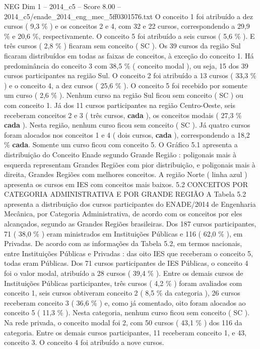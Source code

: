\begin{textsample}{NEG Dim 1 – 2014\_c5 – Score 8.00 – 2014\_c5/enade\_2014\_eng\_mec\_5ff0301576.txt}
O conceito 1 foi atribuído a dez cursos ( 9,3 \% ) e os conceitos 2 e 4, com 32 e 22 cursos, correspondendo a 29,9 \% e 20,6 \%, respectivamente.
O conceito 5 foi atribuído a seis cursos ( 5,6 \% ).
E três cursos ( 2,8 \% ) ficaram sem conceito ( SC ).
Os 39 cursos da região Sul ficaram distribuídos em todas as faixas de conceitos, à exceção do conceito 1.
Há predominância do conceito 3 com 38,5 \% ( conceito modal ), ou seja, 15 dos 39 cursos participantes na região Sul.
O conceito 2 foi atribuído a 13 cursos ( 33,3 \% ) e o conceito 4, a dez cursos ( 25,6 \% ).
O conceito 5 foi recebido por somente um curso ( 2,6 \% ).
Nenhum curso na região Sul ficou sem conceito ( SC ) ou com conceito 1.
Já dos 11 cursos participantes na região Centro-Oeste, seis receberam conceitos 2 e 3 ( três cursos, \textbf{cada} ), os conceitos modais ( 27,3 \% \textbf{cada} ).
Nesta região, nenhum curso ficou sem conceito ( SC ).
Já quatro cursos foram alocados nos conceitos 1 e 4 ( dois cursos, \textbf{cada} ), correspondendo a 18,2 \% \textbf{cada}.
Somente um curso ficou com conceito 5.
O Gráfico 5.1 apresenta a distribuição do Conceito Enade segundo Grande Região : poligonais mais à esquerda representam Grandes Regiões com pior distribuição, e poligonais mais à direita, Grandes Regiões com melhores conceitos.
A região Norte ( linha azul ) apresenta os cursos em IES com conceitos mais baixos. 5.2 CONCEITOS POR CATEGORIA ADMINISTRATIVA E POR GRANDE REGIÃO A Tabela 5.2 apresenta a distribuição dos cursos participantes do ENADE/2014 de Engenharia Mecânica, por Categoria Administrativa, de acordo com os conceitos por eles alcançados, segundo as Grandes Regiões brasileiras.
Dos 187 cursos participantes, 71 ( 38,0 \% ) eram ministrados em Instituições Públicas e 116 ( 62,0 \% ), em Privadas.
De acordo com as informações da Tabela 5.2, em termos nacionais, entre Instituições Públicas e Privadas : das oito IES que receberam o conceito 5, todas eram Públicas.
Dos 71 cursos participantes de IES Públicas, o conceito 4 foi o valor modal, atribuído a 28 cursos ( 39,4 \% ).
Entre os demais cursos de Instituições Públicas participantes, três cursos ( 4,2 \% ) foram avaliados com conceito 1, seis cursos obtiveram conceito 2 ( 8,5 \% da categoria ), 26 cursos receberam conceito 3 ( 36,6 \% ) e, como já comentado, oito foram alocados ao conceito 5 ( 11,3 \% ).
Nesta categoria, nenhum curso ficou sem conceito ( SC ).
Na rede privada, o conceito modal foi 2, com 50 cursos ( 43,1 \% ) dos 116 da categoria.
Entre os demais cursos participantes, 11 receberam conceito 1, e 43, conceito 3.
O conceito 4 foi atribuído a nove cursos.

\end{textsample}
